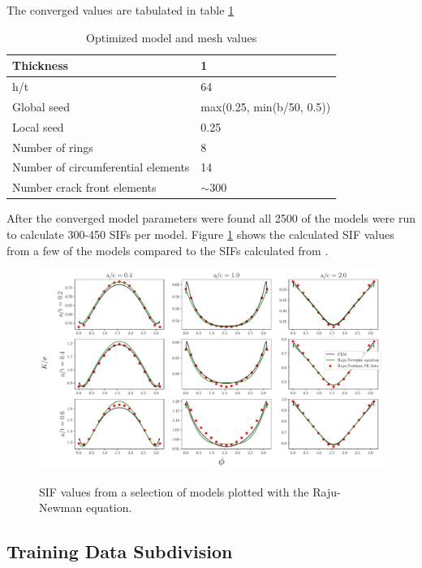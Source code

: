 The converged values are tabulated in table \ref{table:optimized_vals}
\begin{table}[]
\centering
\begin{tabular}{|l|l|}
\hline
Thickness                   & 1         \\ \hline
h/t                         & 64        \\ \hline
Global seed                 & max(0.25, min(b/50, 0.5))      \\ \hline
Local seed                  & 0.25      \\ \hline
Number of rings             & 8         \\ \hline
Number of circumferential elements             & 14        \\ \hline
Number crack front elements & $\sim$300 \\ \hline
\end{tabular}
\caption{Optimized model and mesh values}
\label{table:optimized_vals}
\end{table}




After the converged model parameters were found all 2500 of the models were run to calculate 300-450 SIFs per model. Figure \ref{fig:selected_sifs} shows the calculated SIF values from a few of the models compared to the SIFs calculated from \cite{RNFEM}.  

\begin{figure}
    \centering
    \includegraphics[width=\textwidth]{Figures_pdf/K_data.pdf}
    \label{fig:selected_sifs}
    \caption{SIF values from a selection of models plotted with the Raju-Newman equation.}
\end{figure}


\subsection{Training Data Subdivision}

